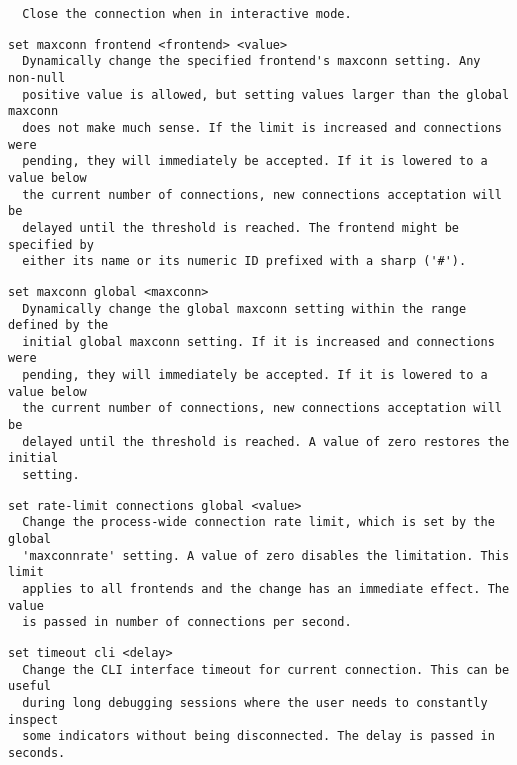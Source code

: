 \begin{verbatim}
  Close the connection when in interactive mode.
\end{verbatim}

\begin{verbatim}
set maxconn frontend <frontend> <value>
  Dynamically change the specified frontend's maxconn setting. Any non-null
  positive value is allowed, but setting values larger than the global maxconn
  does not make much sense. If the limit is increased and connections were
  pending, they will immediately be accepted. If it is lowered to a value below
  the current number of connections, new connections acceptation will be
  delayed until the threshold is reached. The frontend might be specified by
  either its name or its numeric ID prefixed with a sharp ('#').
\end{verbatim}

\begin{verbatim}
set maxconn global <maxconn>
  Dynamically change the global maxconn setting within the range defined by the
  initial global maxconn setting. If it is increased and connections were
  pending, they will immediately be accepted. If it is lowered to a value below
  the current number of connections, new connections acceptation will be
  delayed until the threshold is reached. A value of zero restores the initial
  setting.
\end{verbatim}

\begin{verbatim}
set rate-limit connections global <value>
  Change the process-wide connection rate limit, which is set by the global
  'maxconnrate' setting. A value of zero disables the limitation. This limit
  applies to all frontends and the change has an immediate effect. The value
  is passed in number of connections per second.
\end{verbatim}

\begin{verbatim}
set timeout cli <delay>
  Change the CLI interface timeout for current connection. This can be useful
  during long debugging sessions where the user needs to constantly inspect
  some indicators without being disconnected. The delay is passed in seconds.
\end{verbatim}

